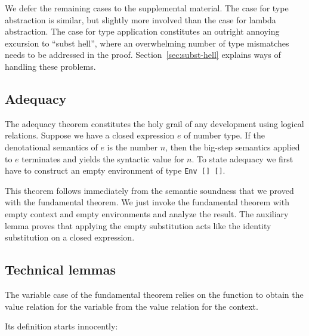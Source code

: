 \documentclass[acmsmall,anonymous,review,screen]{acmart}
\begin{document}
We defer the remaining cases to the supplemental material.
The case for type abstraction is similar, but slightly more involved than the case
for lambda abstraction.
The case for type application constitutes an outright annoying
excursion to ``subst hell'', where an overwhelming number of type
mismatches needs to be addressed in the proof. Section~\ref{sec:subst-hell} explains
ways of handling these problems.

\subsection{Adequacy}
\label{sec:adequacy}

The adequacy theorem constitutes the holy grail of any development
using logical relations.
Suppose we have a closed expression $e$ of number type.
If the denotational semantics of $e$ is the number $n$, then the big-step
semantics applied to $e$ terminates and yields the syntactic value for
$n$.
To state adequacy we first have to construct an empty
environment of type \texttt{Env [] {\Anull} []}.

\begin{minipage}{0.3\linewidth}
  \FundamentalEmptyEnv
\end{minipage}
\begin{minipage}{0.3\linewidth}
  \FundamentalEmptyRelEnv
\end{minipage}
\begin{minipage}{0.3\linewidth}
  \FundamentalEmptyCSub
\end{minipage}
\FundamentalAdequacyType
This theorem follows immediately from the semantic soundness that we proved with the
fundamental theorem.
\FundamentalAdequacyBody
We just invoke the fundamental theorem with empty context and empty
environments and analyze the result. The auxiliary lemma
{\ACsubClosed} proves that applying the empty substitution acts like
the identity substitution on a closed expression.
\FundamentalCsubClosed


\subsection{Technical lemmas}
\label{sec:technical-lemmas}

The variable case of the fundamental theorem relies on the function
{\AGLookup} to obtain the value relation for the variable from the
value relation for the context. 
\LRVrenMCGLookupType

Its definition starts innocently:
\LRVrenMCGLookupBody
\end{document}
